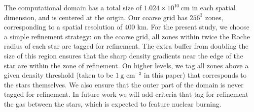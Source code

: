 \documentclass[iop]{../emulateapj}
\begin{document}
The computational domain has a total size of $1.024 \times
10^{10}\ \text{cm}$ in each spatial dimension, and is centered at the
origin. Our coarse grid has $256^3$ zones, corresponding to a spatial
resolution of 400 km. For the present study, we choose a simple
refinement strategy: on the coarse grid, all zones within twice the Roche radius of each
star are tagged for refinement. The extra buffer from doubling
the size of this region ensures that the sharp density gradients near
the edge of the star are within the zone of refinement. On higher levels, 
we tag all zones above a given density threshold (taken to be $1\ \text{g cm}^{-3}$ 
in this paper) that corresponds to the stars themselves. We also ensure
that the outer part of the domain is never tagged for refinement. In
future work we will add criteria that tag for refinement the gas
between the stars, which is expected to feature nuclear burning.
\end{document}
